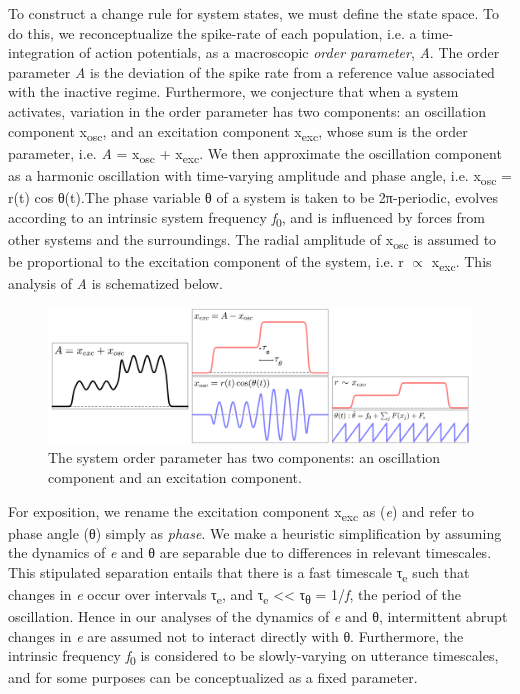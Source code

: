 To construct a change rule for system states, we must define the state space. To do this, we reconceptualize the spike-rate of each population, i.e. a time-integration of action potentials, as a macroscopic \textit{order parameter}, \textit{A}. The order parameter \textit{A} is the deviation of the spike rate from a reference value associated with the inactive regime. Furthermore, we conjecture that when a system activates, variation in the order parameter has two components: an oscillation component x\textsubscript{osc}, and an excitation component x\textsubscript{exc}, whose sum is the order parameter, i.e. \textit{A} = x\textsubscript{osc} + x\textsubscript{exc}. We then approximate the oscillation component as a harmonic oscillation with time-varying amplitude and phase angle, i.e. x\textsubscript{osc} = r(t) cos θ(t).The phase variable θ of a system is taken to be 2π{}-periodic, evolves according to an intrinsic system frequency \textit{f}\textsubscript{0}, and is influenced by forces from other systems and the surroundings. The radial amplitude of x\textsubscript{osc} is assumed to be proportional to the excitation component of the system, i.e. r  ${\propto}$ x\textsubscript{exc}. This analysis of \textit{A} is schematized below.  

  
\begin{figure}
\includegraphics[width=\textwidth]{figures/Tilsen-img12.png}
\caption{The system order parameter has two components: an oscillation component and an excitation component.}
\label{fig:2:5}
\end{figure}
 

  For exposition, we rename the excitation component x\textsubscript{exc} as (\textit{e}) and refer to phase angle (θ) simply as \textit{phase}. We make a heuristic simplification by assuming the dynamics of \textit{e} and θ are separable due to differences in relevant timescales. This stipulated separation entails that there is a fast timescale τ\textsubscript{e} such that changes in \textit{e} occur over intervals τ\textsubscript{e}, and τ\textsubscript{e} << τ\textsubscript{θ} = 1/\textit{f}, the period of the oscillation. Hence in our analyses of the dynamics of \textit{e} and θ, intermittent abrupt changes in \textit{e} are assumed not to interact directly with θ. Furthermore, the intrinsic frequency \textit{f}\textsubscript{0} is considered to be slowly-varying on utterance timescales, and for some purposes can be conceptualized as a fixed parameter. 


